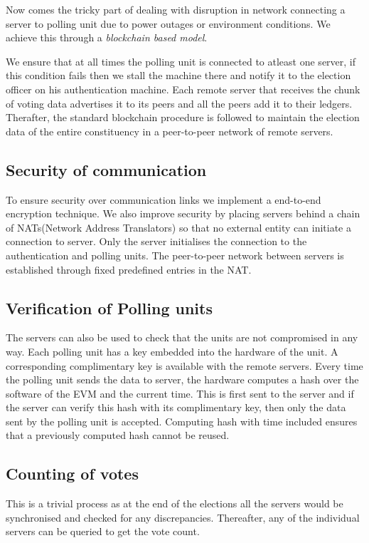 \documentclass[a4paper,12pt,openany]{book}
\begin{document}
Now comes the tricky part of dealing with disruption in network connecting a server to polling unit due to power outages or environment conditions. We achieve this through a \emph{blockchain based model}.

We ensure that at all times the polling unit is connected to atleast one server, if this condition fails then we stall the machine there and notify it to the election officer on his authentication machine. Each remote server that receives the chunk of voting data advertises it to its peers and all the peers add it to their ledgers. Therafter, the standard blockchain procedure is followed to maintain the election data of the entire constituency in a peer-to-peer network of remote servers. 

\subsection{Security of communication}
To ensure security over communication links we implement a end-to-end encryption technique. We also improve security by placing servers behind a chain of NATs(Network Address Translators) so that no external entity can initiate a connection to server. Only the server initialises the connection to the authentication and polling units. The peer-to-peer network between servers is established through fixed predefined entries in the NAT.

\subsection{Verification of Polling units}
The servers can also be used to check that the units are not compromised in any way. Each polling unit has a key embedded into the hardware of the unit. A corresponding complimentary key is available with the remote servers.
Every time the polling unit sends the data to server, the hardware computes a hash over the software of the EVM and the current time. This is first sent to the server and if the server can verify this hash with its complimentary key, then only the data sent by the polling unit is accepted. Computing hash with time included ensures that a previously computed hash cannot be reused.

\subsection{Counting of votes}
This is a trivial process as at the end of the elections all the servers would be synchronised and checked for any discrepancies. Thereafter, any of the individual servers can be queried to get the vote count.
\end{document}
